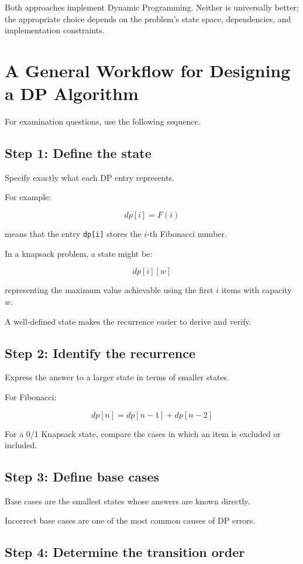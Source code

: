 Both approaches implement Dynamic Programming. Neither is universally better; the appropriate choice depends on the problem's state space, dependencies, and implementation constraints.

\section{A General Workflow for Designing a DP Algorithm}

For examination questions, use the following sequence.

\subsection{Step 1: Define the state}

Specify exactly what each DP entry represents.

For example:


\[
dp[i]=F(i)
\]


means that the entry \texttt{dp[i]} stores the $i$-th Fibonacci number.

In a knapsack problem, a state might be:


\[
dp[i][w]
\]


representing the maximum value achievable using the first $i$ items with capacity $w$.

A well-defined state makes the recurrence easier to derive and verify.

\subsection{Step 2: Identify the recurrence}

Express the answer to a larger state in terms of smaller states.

For Fibonacci:


\[
dp[n]=dp[n-1]+dp[n-2]
\]


For a 0/1 Knapsack state, compare the cases in which an item is excluded or included.

\subsection{Step 3: Define base cases}

Base cases are the smallest states whose answers are known directly.

Incorrect base cases are one of the most common causes of DP errors.

\subsection{Step 4: Determine the transition order}

